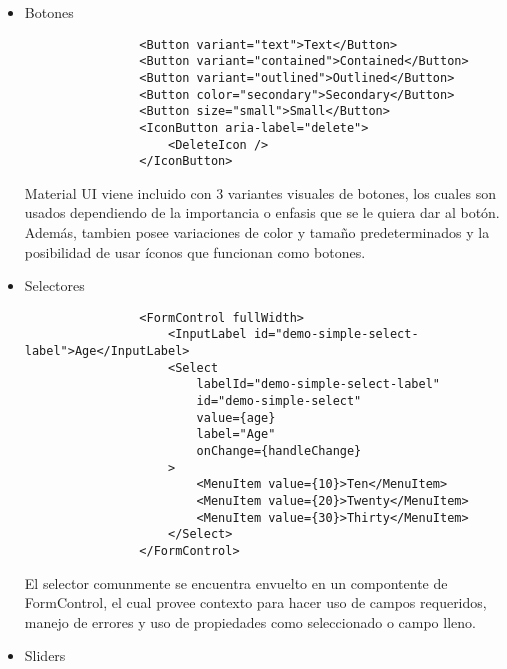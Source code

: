\begin{itemize}
  \item Botones\\

        \begin{lstlisting}
                <Button variant="text">Text</Button>
                <Button variant="contained">Contained</Button>
                <Button variant="outlined">Outlined</Button>
                <Button color="secondary">Secondary</Button>
                <Button size="small">Small</Button>
                <IconButton aria-label="delete">
                    <DeleteIcon />
                </IconButton>
            \end{lstlisting}

        Material UI viene incluido con 3 variantes visuales de botones, los cuales son usados dependiendo de la importancia o enfasis que se le quiera dar al botón. Además, tambien posee variaciones de color y tamaño predeterminados y la posibilidad de usar íconos que funcionan como botones.

  \item Selectores\\

        \begin{lstlisting}
                <FormControl fullWidth>
                    <InputLabel id="demo-simple-select-label">Age</InputLabel>
                    <Select
                        labelId="demo-simple-select-label"
                        id="demo-simple-select"
                        value={age}
                        label="Age"
                        onChange={handleChange}
                    >
                        <MenuItem value={10}>Ten</MenuItem>
                        <MenuItem value={20}>Twenty</MenuItem>
                        <MenuItem value={30}>Thirty</MenuItem>
                    </Select>
                </FormControl>
            \end{lstlisting}

        El selector comunmente se encuentra envuelto en un compontente de FormControl, el cual provee contexto para hacer uso de campos requeridos, manejo de errores y uso de propiedades como seleccionado o campo lleno.

  \item Sliders\\


\end{itemize}
